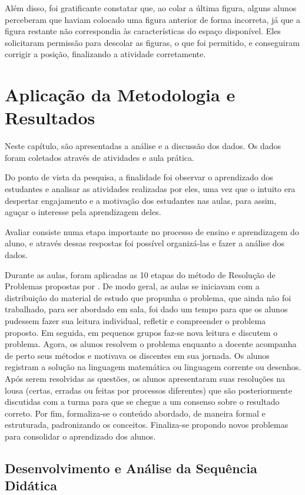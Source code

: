 Além disso, foi gratificante constatar que, ao colar a última figura, alguns alunos perceberam que haviam colocado uma figura anterior de forma incorreta, já que a figura restante não correspondia às características do espaço disponível. Eles solicitaram permissão para descolar as figuras, o que foi permitido, e conseguiram corrigir a posição, finalizando a atividade corretamente.

\chapter{Aplicação da Metodologia e Resultados} \label{cap:4_aplicacao}

Neste capítulo, são apresentadas a análise e a discussão dos dados. Os dados foram coletados através de atividades e aula prática.

Do ponto de vista da pesquisa, a finalidade foi observar o aprendizado dos estudantes e analisar as atividades realizadas por eles, uma vez que o intuito era despertar engajamento e a motivação dos estudantes nas aulas, para assim, aguçar o interesse pela aprendizagem deles.

Avaliar consiste numa etapa importante no processo de ensino e aprendizagem do aluno, e através dessas respostas foi possível organizá-las e fazer a análise dos dados.

Durante as aulas, foram aplicadas as 10 etapas do método de Resolução de Problemas propostas por . De modo geral, as aulas se iniciavam com a distribuição do material de estudo que propunha o problema, que ainda não foi trabalhado, para ser abordado em sala, foi dado um tempo para que os alunos pudessem fazer sua leitura individual, refletir e compreender o problema proposto. Em seguida, em pequenos grupos faz-se nova leitura e discutem o problema. Agora, os alunos resolvem o problema enquanto a docente acompanha de perto seus métodos e motivava os discentes em sua jornada. Os alunos registram a solução na linguagem matemática ou linguagem corrente ou desenhos. Após serem resolvidas as questões, os alunos apresentaram suas resoluções na lousa (certas, erradas ou feitas por processos diferentes) que são posteriormente discutidas com a turma para que se chegue a um consenso sobre o resultado correto. Por fim, formaliza-se o conteúdo abordado, de maneira formal e estruturada, padronizando os conceitos. Finaliza-se propondo novos problemas para consolidar o aprendizado dos alunos.

\section{Desenvolvimento e Análise da Sequência Didática}

